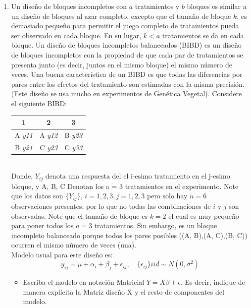 \documentclass[12pt,a4paper]{report}
\author{Guadalupe Monroy}
\begin{document}

\begin{enumerate}
\item Un diseño de bloques incompletos con $a$ tratamientos y $b$ bloques es similar a un diseño de bloques al azar completo, excepto que el tamaño de bloque $k$, es demasiado pequeño para permitir el juego completo de tratamientos pueda ser observado en cada bloque. En su lugar, $k < a$ tratamientos se da en cada bloque. Un diseño de bloques incompletos balanceados (BIBD) es un diseño de bloques incompletos con la propiedad de que cada par de tratamientos se presenta junto (es decir, juntos en el mismo bloque) el mismo número de veces. Una buena característica de un BIBD es que todas las diferencias por pares entre los efectos del tratamiento son estimadas con la misma precisión. (Este diseño se usa mucho en experimentos de Genética Vegetal). Considere el siguiente BIBD:\\

\begin{tabular}{| c | c | c |}
\hline
1 & 2 & 3\\ \hline
A \textit{y11} & A \textit{y12} & B \textit{y23}\\
B \textit{y21} & C \textit{y23} & C \textit{y33}\\
\hline
\end{tabular}
\\

Donde, $Y_{ij}$ denota una respuesta del el i-esimo tratamiento en el j-esimo bloque, y A, B, C Denotan los a = 3 tratamientos en el experimento. Note que los datos son $\lbrace Y_{ij}\rbrace$, $i = 1, 2, 3, j = 1, 2, 3$ pero solo hay $n = 6$ observaciones presentes, por lo que no todas las combinaciones de $i$ y $j$ son  observadas. Note que el tamaño de bloque es $k = 2$ el cual es muy pequeño para poner todos los $a = 3$ tratamientos. Sin embargo, es un bloque incompleto balanceado porque todos los pares posibles ((A, B),(A, C),(B, C)) ocurren el mismo número de veces (una).\\

Modelo usual para este diseño es:\\
$$y_{ij}=\mu +\alpha_{i}+\beta_{j}+\epsilon_{ij},\quad \lbrace\epsilon_{ij}\rbrace iid\sim N(0,\sigma^{2}) $$

\begin{itemize}
\item Escriba el modelo en notación Matricial $Y = X\beta + \epsilon$. Es decir, indique de manera explícita la Matriz diseño X y el resto de componentes del modelo.\\


\end{itemize}
\end{enumerate}
\end{document}
